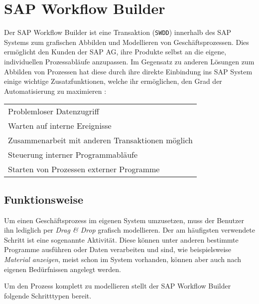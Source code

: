 \documentclass{handout}
\begin{document}
\section{SAP Workflow Builder}
Der SAP Workflow Builder ist eine Transaktion (\texttt{SWDD}) innerhalb des SAP Systems zum grafischen Abbilden und Modellieren von Geschäftsprozessen. Dies ermöglicht den Kunden der SAP AG, ihre Produkte selbst an die eigene, individuellen Prozessabläufe anzupassen. Im Gegensatz zu anderen Lösungen zum Abbilden von Prozessen hat diese durch ihre direkte Einbindung ins SAP System einige wichtige Zusatzfunktionen, welche ihr ermöglichen, den Grad der Automatisierung zu maximieren \cite{SAPHelpWf}:

\small
\begin{tabular}{L}
Problemloser Datenzugriff\\
Warten auf interne Ereignisse\\
Zusammenarbeit mit anderen Transaktionen möglich\\
Steuerung interner Programmabläufe\\
Starten von Prozessen externer Programme
\end{tabular}
\normalsize

\subsection{Funktionsweise}
Um einen Geschäftsprozess im eigenen System umzusetzen, muss der Benutzer ihn lediglich per \textit{Drag \& Drop} grafisch modellieren. Der am häufigsten verwendete Schritt ist eine sogenannte Aktivität. Diese können unter anderen bestimmte Programme ausführen oder Daten verarbeiten und sind, wie beispielsweise \textit{Material anzeigen}, meist schon im System vorhanden, können aber auch nach eigenen Bedürfnissen angelegt werden.

Um den Prozess komplett zu modellieren stellt der SAP Workflow Builder folgende Schritttypen bereit.
\end{document}

